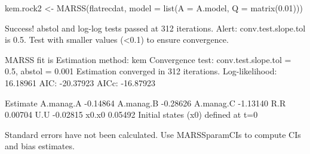 \begin{Schunk}
\begin{Sinput}
 kem.rock2 <- MARSS(flatrecdat, model = list(A = A.model, Q = matrix(0.01)))
\end{Sinput}
\begin{Soutput}
Success! abstol and log-log tests passed at 312 iterations.
Alert: conv.test.slope.tol is 0.5.
Test with smaller values (<0.1) to ensure convergence.

MARSS fit is
Estimation method: kem 
Convergence test: conv.test.slope.tol = 0.5, abstol = 0.001
Estimation converged in 312 iterations. 
Log-likelihood: 16.18961 
AIC: -20.37923   AICc: -16.87923   
 
          Estimate
A.manag.A -0.14864
A.manag.B -0.28626
A.manag.C -1.13140
R.R        0.00704
U.U       -0.02815
x0.x0      0.05492
Initial states (x0) defined at t=0

Standard errors have not been calculated. 
Use MARSSparamCIs to compute CIs and bias estimates.
\end{Soutput}
\end{Schunk}
